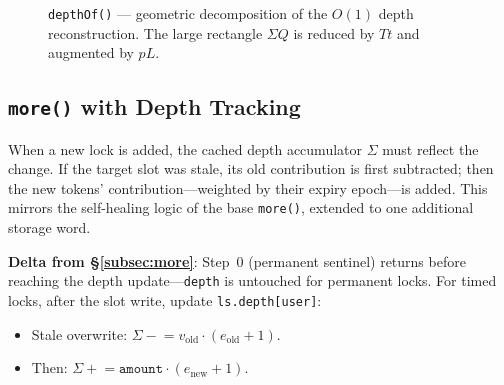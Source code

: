 \documentclass[10pt,a4paper,twocolumn]{article}
\begin{document}
\begin{figure}[htbp]
\centering
{}
\caption{\texttt{depthOf()} --- geometric decomposition of the $O(1)$ depth reconstruction. The large rectangle $\Sigma Q$ is reduced by $Tt$ and augmented by $pL$.}
\label{fig:depthof-geometry}
\end{figure}

\subsection{\texttt{more()} with Depth Tracking}
\label{subsec:more-depth}

When a new lock is added, the cached depth accumulator $\Sigma$ must reflect the change.  If the target slot was stale, its old contribution is first subtracted; then the new tokens' contribution---weighted by their expiry epoch---is added.  This mirrors the self-healing logic of the base \texttt{more()}, extended to one additional storage word.

\textbf{Delta from \S\ref{subsec:more}}: Step~0 (permanent sentinel) returns before reaching the depth update---\texttt{depth} is untouched for permanent locks. For timed locks, after the slot write, update \texttt{ls.depth[user]}:
\begin{itemize}[nosep]
\item Stale overwrite: $\Sigma \mathrel{-}= v_{\text{old}} \cdot (e_{\text{old}}{+}1)$.
\item Then: $\Sigma \mathrel{+}= \texttt{amount} \cdot (e_{\text{new}}{+}1)$.
\end{itemize}
\end{document}
